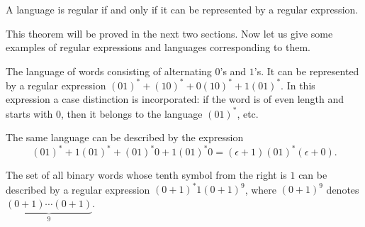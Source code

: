 \begin{page}
\setcounter{section}{2}
\setcounter{subsection}{1}
\setcounter{dfn}{3}
\label{portion:958}

\begin{thm}
\label{thm:RegLangExpr}
A language is regular if and only if it can be represented by a regular expression.
\end{thm}

\end{page}

\begin{page}
\setcounter{section}{2}
\setcounter{subsection}{1}
\setcounter{dfn}{3}
\label{portion:959}


This theorem will be proved in the next two sections.
Now let us give some examples of regular expressions and languages corresponding to them.


\end{page}

\begin{page}
\setcounter{section}{2}
\setcounter{subsection}{1}
\setcounter{dfn}{4}
\label{portion:961}

\begin{exl}
The language of words consisting of alternating $0$'s and $1$'s.
It can be represented by a regular expression $(01)^* + (10)^* + 0(10)^* + 1(01)^*$.
In this expression a case distinction is incorporated: if the word is of even length and starts with $0$,
then it belongs to the language $(01)^*$, etc.

The same language can be described by the expression
\[
(01)^* + 1(01)^* + (01)^*0 + 1(01)^*0 = (\epsilon + 1)(01)^*(\epsilon + 0).
\]
\end{exl}

\end{page}

\begin{page}
\setcounter{section}{2}
\setcounter{subsection}{1}
\setcounter{dfn}{5}
\label{portion:964}

\begin{exl}
The set of all binary words whose tenth symbol from the right is $1$ can be described by a regular expression $(0+1)^* 1 (0+1)^9$,
where $(0+1)^9$ denotes $\underbrace{(0+1)\cdots (0+1)}_{9}$.
\end{exl}

\end{page}

